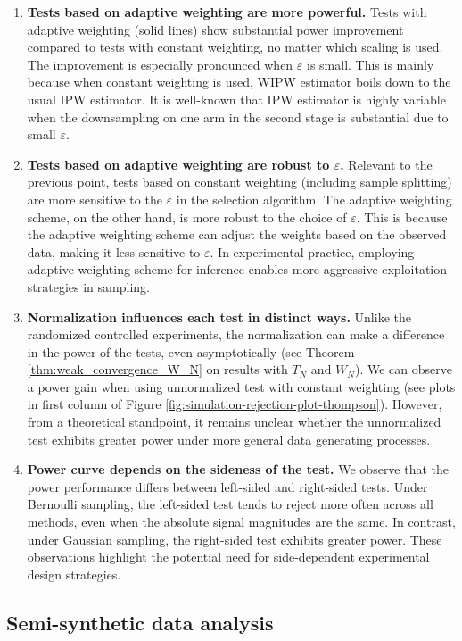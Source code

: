 \documentclass[12pt]{article}
\begin{document}
\begin{enumerate} 
	\item \textbf{Tests based on adaptive weighting are more powerful.} Tests with adaptive weighting (solid lines) show substantial power improvement compared to tests with constant weighting, no matter which scaling is used. The improvement is especially pronounced when $\varepsilon$ is small. This is mainly because when constant weighting is used, WIPW estimator boils down to the usual IPW estimator. It is well-known that IPW estimator is highly variable when the downsampling on one arm in the second stage is substantial due to small $\varepsilon$.
	\item \textbf{Tests based on adaptive weighting are robust to $\varepsilon$.} Relevant to the previous point, tests based on constant weighting (including sample splitting) are more sensitive to the $\varepsilon$ in the selection algorithm. The adaptive weighting scheme, on the other hand, is more robust to the choice of $\varepsilon$. This is because the adaptive weighting scheme can adjust the weights based on the observed data, making it less sensitive to $\varepsilon$. In experimental practice, employing adaptive weighting scheme for inference enables more aggressive exploitation strategies in sampling.
	\item \textbf{Normalization influences each test in distinct ways.} Unlike the randomized controlled experiments, the normalization can make a difference in the power of the tests, even asymptotically (see Theorem \ref{thm:weak_convergence_W_N} on results with $T_N$ and $W_N$). We can observe a power gain when using unnormalized test with constant weighting (see plots in first column of Figure \ref{fig:simulation-rejection-plot-thompson}). However, from a theoretical standpoint, it remains unclear whether the unnormalized test exhibits greater power under more general data generating processes. 
	\item \textbf{Power curve depends on the sideness of the test.} We observe that the power performance differs between left-sided and right-sided tests. Under Bernoulli sampling, the left-sided test tends to reject more often across all methods, even when the absolute signal magnitudes are the same. In contrast, under Gaussian sampling, the right-sided test exhibits greater power. These observations highlight the potential need for side-dependent experimental design strategies.
\end{enumerate}


\subsection{Semi-synthetic data analysis}\label{sec:semi-sythetic-data}
\end{document}

